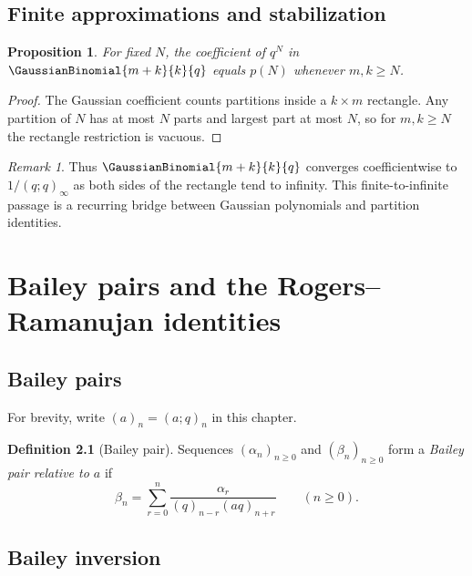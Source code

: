 \documentclass[11pt,a4paper,oneside,openany]{book}
\newtheorem{proposition}[proposition]{Proposition}
\theoremstyle{definition}
\newtheorem{definition}[definition]{Definition}
\theoremstyle{remark}
\newtheorem{remark}[remark]{Remark}
\begin{document}
\section{Finite approximations and stabilization}

\begin{proposition}\label{prop:partition-stabilization}
For fixed $N$, the coefficient of $q^N$ in $\GaussianBinomial{m+k}{k}{q}$ equals $p(N)$ whenever $m,k\ge N$.
\end{proposition}

\begin{proof}
The Gaussian coefficient counts partitions inside a $k\times m$ rectangle.  Any partition of $N$ has at most $N$ parts and largest part at most $N$, so for $m,k\ge N$ the rectangle restriction is vacuous.
\end{proof}

\begin{remark}
Thus $\GaussianBinomial{m+k}{k}{q}$ converges coefficientwise to $1/(q;q)_\infty$ as both sides of the rectangle tend to infinity.  This finite-to-infinite passage is a recurring bridge between Gaussian polynomials and partition identities.
\end{remark}

\chapter{Bailey pairs and the Rogers--Ramanujan identities}\label{chap:bailey}

\section{Bailey pairs}

For brevity, write $(a)_n=(a;q)_n$ in this chapter.

\begin{definition}[Bailey pair]\label{qg:def-bailey-pair}
Sequences $(\alpha_n)_{n\ge0}$ and $(\beta_n)_{n\ge0}$ form a \emph{Bailey pair relative to $a$} if
\begin{equation}\label{eq:bailey-pair}
 \beta_n=\sum_{r=0}^{n}\frac{\alpha_r}{(q)_{n-r}(aq)_{n+r}}
 \qquad(n\ge0).
\end{equation}
\end{definition}

\section{Bailey inversion}
\end{document}
